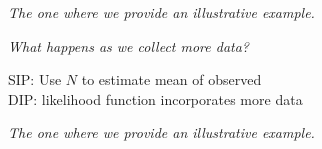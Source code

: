 \begin{frame}{\it The one where we provide an illustrative example.}

\centering
\emph{What happens as we collect more data?}
\bigskip

SIP: Use $N$ to estimate mean of observed \\
DIP: likelihood function incorporates more data

\end{frame}

\begin{frame}{\it The one where we provide an illustrative example.}

\begin{figure}
\centering
\end{figure}
\end{frame}
